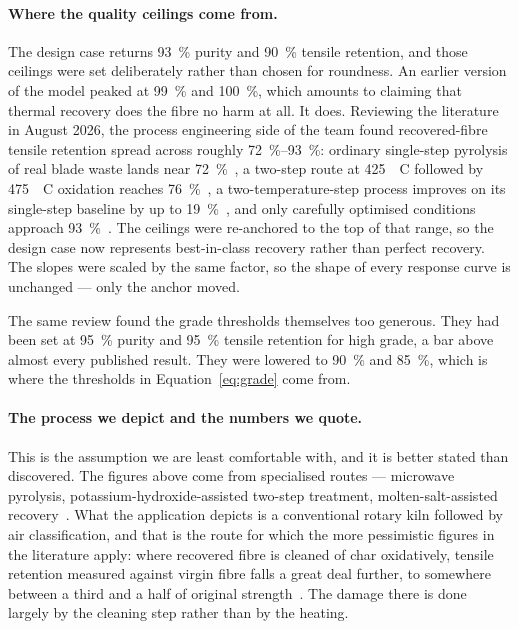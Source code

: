 \paragraph{Where the quality ceilings come from.}
The design case returns \SI{93}{\%} purity and \SI{90}{\%} tensile retention, and those ceilings were set deliberately rather than chosen for roundness. An earlier version of the model peaked at \SI{99}{\%} and \SI{100}{\%}, which amounts to claiming that thermal recovery does the fibre no harm at all. It does. Reviewing the literature in August 2026, the process engineering side of the team found recovered-fibre tensile retention spread across roughly \SIrange{72}{93}{\%}: ordinary single-step pyrolysis of real blade waste lands near \SI{72}{\%}~\cite{microwave}, a two-step route at \SI{425}{\textdegree C}
followed by \SI{475}{\textdegree C} oxidation reaches
\SI{76}{\%}~\cite{koh2021}, a two-temperature-step process improves on its single-step baseline by up to \SI{19}{\%}~\cite{twostep}, and only carefully optimised conditions approach \SI{93}{\%}~\cite{frpreview}. The ceilings were re-anchored to the top of that range, so the design case now represents best-in-class recovery rather than perfect recovery. The slopes were scaled by the same factor, so the shape of every response curve is unchanged --- only the anchor moved.

The same review found the grade thresholds themselves too generous. They had been set at \SI{95}{\%} purity and \SI{95}{\%} tensile retention for high grade, a bar above almost every published result. They were lowered to \SI{90}{\%} and \SI{85}{\%}, which is where the thresholds in Equation~\ref{eq:grade} come from.

\paragraph{The process we depict and the numbers we quote.}
This is the assumption we are least comfortable with, and it is better stated than discovered. The figures above come from specialised routes --- microwave pyrolysis, potassium-hydroxide-assisted two-step treatment, molten-salt-assisted recovery~\cite{moltensalt}. What the application depicts is a conventional rotary kiln followed by air classification, and that is the route for which the more pessimistic figures in the literature apply: where recovered fibre is cleaned of char oxidatively, tensile retention measured against virgin fibre falls a great deal further, to somewhere between a third and a half of original
strength~\cite{feih2011,feih2015,conditioning2014}. The damage there is done largely by the cleaning step rather than by the heating.


